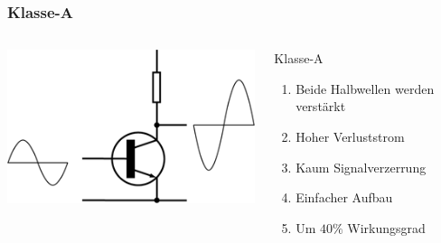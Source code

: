 \begin{frame}
    \frametitle{Klasse-A}
        \begin{columns}[c]
        \column[c]{4cm}
        \begin{center}
            \includegraphics[width=1\textwidth]{a07/Electronic_Amplifier_Class_A.png}\\
            \tiny \hyperlink{refs}{\cite{wm}}
    \end{center}
    \column{5cm} \large
    \begin{block}{Klasse-A}
	    \begin{enumerate} 
			\item Beide Halbwellen werden verstärkt
			\item Hoher Verluststrom
			\item Kaum Signalverzerrung
			\item Einfacher Aufbau
			\item Um $40\%$ Wirkungsgrad
    	\end{enumerate}
    \end{block}
    \end{columns}
\end{frame}

